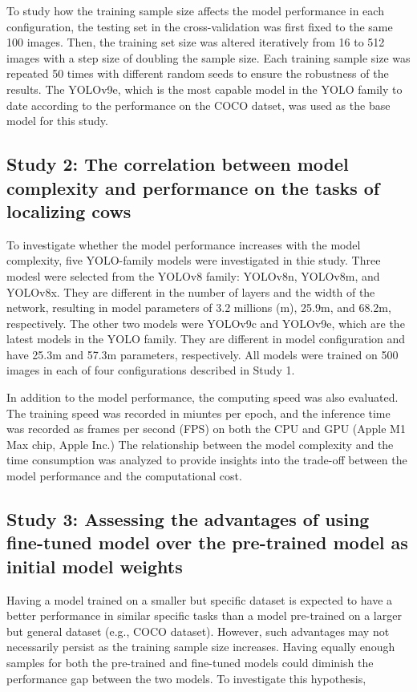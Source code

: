 To study how the training sample size affects the model performance in each configuration, the testing set in the cross-validation was first fixed to the same 100 images. Then, the training set size was altered iteratively from 16 to 512 images with a step size of doubling the sample size. Each training sample size was repeated 50 times with different random seeds to ensure the robustness of the results. The YOLOv9e, which is the most capable model in the YOLO family to date according to the performance on the COCO datset, was used as the base model for this study.


\subsection*{Study 2: The correlation between model complexity and performance on the tasks of localizing cows}

To investigate whether the model performance increases with the model complexity, five YOLO-family models were investigated in thie study. Three modesl were selected from the YOLOv8 family: YOLOv8n, YOLOv8m, and YOLOv8x. They are different in the number of layers and the width of the network, resulting in model parameters of 3.2 millions (m), 25.9m, and 68.2m, respectively. The other two models were YOLOv9c and YOLOv9e, which are the latest models in the YOLO family. They are different in model configuration and have 25.3m and 57.3m parameters, respectively. All models were trained on 500 images in each of four configurations described in Study 1.

In addition to the model performance, the computing speed was also evaluated. The training speed was recorded in miuntes per epoch, and the inference time was recorded as frames per second (FPS) on both the CPU and GPU (Apple M1 Max chip, Apple Inc.) The relationship between the model complexity and the time consumption was analyzed to provide insights into the trade-off between the model performance and the computational cost.

\subsection*{Study 3: Assessing the advantages of using fine-tuned model over the pre-trained model as initial model weights}

Having a model trained on a smaller but specific dataset is expected to have a better performance in similar specific tasks than a model pre-trained on a larger but general dataset (e.g., COCO dataset). However, such advantages may not necessarily persist as the training sample size increases. Having equally enough samples for both the pre-trained and fine-tuned models could diminish the performance gap between the two models. To investigate this hypothesis,







